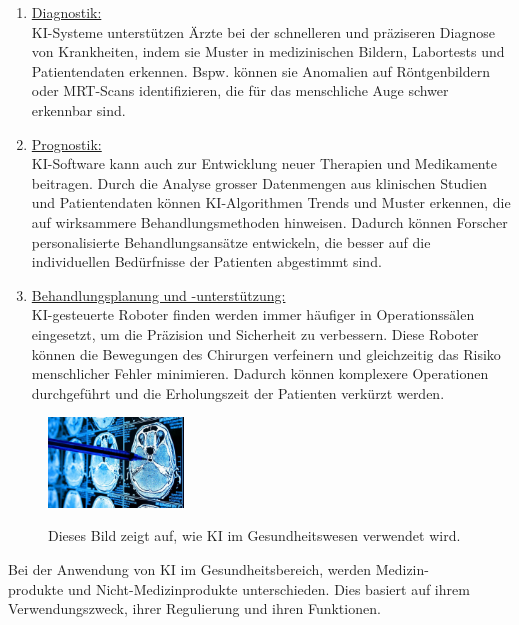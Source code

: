 \documentclass{report}
\begin{document}
\begin{enumerate}
    \item \underline{Diagnostik:} \\KI-Systeme unterstützen Ärzte bei der schnelleren und präziseren Diagnose 
    von Krankheiten, indem sie Muster in medizinischen Bildern, Labortests und Patientendaten erkennen.
    Bspw. können sie Anomalien auf Röntgenbildern oder MRT-Scans identifizieren, die für das menschliche 
    Auge schwer erkennbar sind.
    \item \underline{Prognostik:} \\KI-Software kann auch zur Entwicklung neuer Therapien und Medikamente beitragen. 
    Durch die Analyse grosser Datenmengen aus klinischen Studien und Patientendaten können KI-Algorithmen 
    Trends und Muster erkennen, die auf wirksammere Behandlungsmethoden hinweisen. Dadurch können Forscher 
    personalisierte Behandlungsansätze entwickeln, die besser auf die individuellen Bedürfnisse der 
    Patienten abgestimmt sind. 
    \item \underline{Behandlungsplanung und -unterstützung:} \\KI-gesteuerte Roboter finden werden immer häufiger in
    Operationssälen eingesetzt, um die Präzision und Sicherheit zu verbessern. Diese Roboter können
    die Bewegungen des Chirurgen verfeinern und gleichzeitig das Risiko menschlicher Fehler minimieren. 
    Dadurch können komplexere Operationen durchgeführt und die Erholungszeit der Patienten verkürzt werden. \citep{mauriceneumann.de}
\end{enumerate} 

\begin{figure}[H]
    \centering
    \includegraphics[width=0.32\textwidth]{fotitooppa.jpg}
    \label{fig:fotitooppa}
    \caption{Dieses Bild zeigt auf, wie KI im Gesundheitswesen verwendet wird.}
\end{figure}

Bei der Anwendung von KI im Gesundheitsbereich, werden Medizin-\\produkte und Nicht-Medizinprodukte 
unterschieden. Dies basiert auf ihrem Verwendungszweck, ihrer Regulierung und ihren Funktionen.
\end{document}
